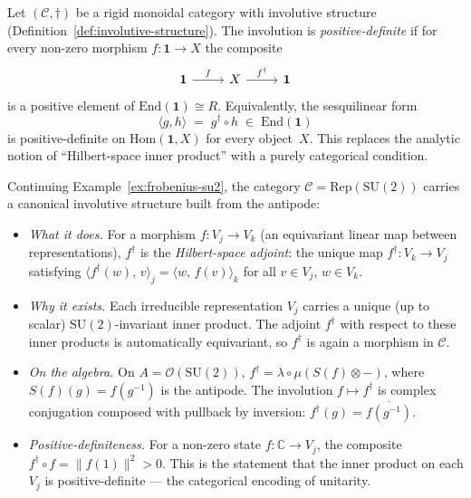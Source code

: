 \begin{definition}
\label{def:positive-definite-dagger}
\leanok
Let $(\mathcal{C}, \dagger)$ be a rigid monoidal category with involutive
structure (Definition~\ref{def:involutive-structure}).  The involution is
\emph{positive-definite} if for every non-zero
morphism $f \colon \mathbf{1} \to X$ the composite
\begin{equation}\label{eq:positive-definite-cd}
\begin{tikzcd}[column sep=2.5em]
  \mathbf{1} \ar[r, "f"]
  & X \ar[r, "f^{\dagger}"]
  & \mathbf{1}
\end{tikzcd}
\end{equation}
is a positive element of $\mathrm{End}(\mathbf{1}) \cong R$.
Equivalently, the sesquilinear form
\[
  \langle g, h \rangle
  \;=\; g^{\dagger} \circ h
  \;\in\; \mathrm{End}(\mathbf{1})
\]
is positive-definite on $\mathrm{Hom}(\mathbf{1}, X)$ for every
object~$X$.  This replaces the analytic notion of ``Hilbert-space inner
product'' with a purely categorical condition.
\end{definition}

\begin{example}
\label{ex:dagger-su2}
Continuing Example~\ref{ex:frobenius-su2}, the category
$\mathcal{C} = \mathrm{Rep}(\mathrm{SU}(2))$ carries a canonical
involutive structure built from the antipode:
\begin{itemize}
  \item \emph{What it does.}\;  For a morphism $f \colon V_j \to V_k$
        (an equivariant linear map between representations),
        $f^{\dagger}$ is the \emph{Hilbert-space adjoint}: the unique
        map $f^{\dagger} \colon V_k \to V_j$ satisfying
        $\langle f^{\dagger}(w),\, v \rangle_j
        = \langle w,\, f(v) \rangle_k$
        for all $v \in V_j$, $w \in V_k$.
  \item \emph{Why it exists.}\;  Each irreducible representation $V_j$
        carries a unique (up to scalar) $\mathrm{SU}(2)$-invariant
        inner product.  The adjoint $f^{\dagger}$ with respect to
        these inner products is automatically equivariant, so
        $f^{\dagger}$ is again a morphism in $\mathcal{C}$.
  \item \emph{On the algebra.}\;  On $A = \mathcal{O}(\mathrm{SU}(2))$,
        $f^{\dagger} = \lambda \circ \mu(S(f) \otimes -)$, where
        $S(f)(g) = f(g^{-1})$ is the antipode.  The involution
        $f \mapsto f^{\dagger}$ is complex conjugation composed with
        pullback by inversion: $f^{\dagger}(g) = \overline{f(g^{-1})}$.
  \item \emph{Positive-definiteness.}\;  For a non-zero state
        $f \colon \mathbb{C} \to V_j$, the composite
        $f^{\dagger} \circ f = \lVert f(1) \rVert^2 > 0$.
        This is the statement that the inner product on each $V_j$ is
        positive-definite --- the categorical encoding of unitarity.
\end{itemize}
\end{example}

